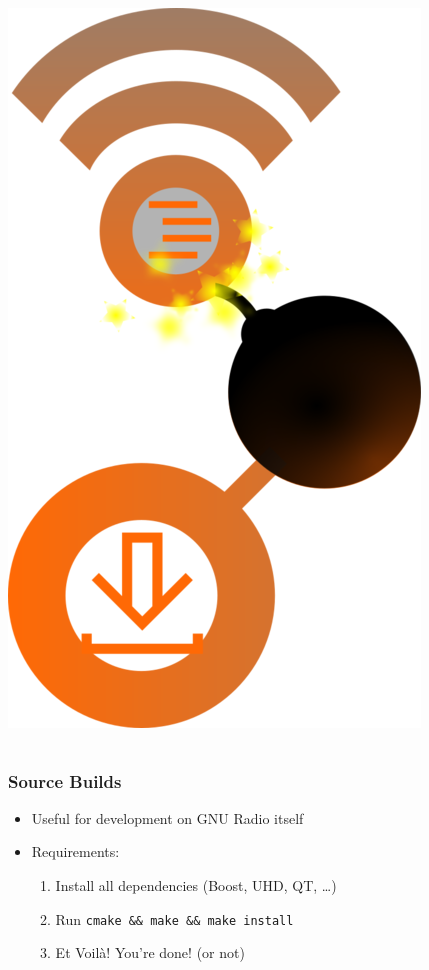 \documentclass{beamer}
\begin{document}
\begin{frame}
\begin{columns}[c]
  \includegraphics[width=\textwidth]{pybombs_logo}

  \end{columns}
\end{frame}

\begin{frame}
  \frametitle{Source Builds}
  \begin{itemize}
    \item Useful for development on GNU Radio itself
    \item Requirements:
      \begin{enumerate}
        \item Install all dependencies (Boost, UHD, QT, \ldots)
        \item Run \texttt{cmake \&\& make \&\& make install}
        \item Et Voilà! You're done! (or not)
      \end{enumerate}
  \end{itemize}
\end{frame}
\end{document}
